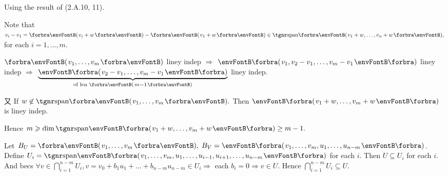 Using the result of (2.A.10, 11).\par\quad
Note that $v_i-v_1=\Par{v_i+w}-\Par{v_1+w}\in\Span{v_1+w,\dots,v_n+w},$ for each $i=1,\dots,m$.\par\quad
$\Par{v_1,\dots,v_m}$ liney indep $\Rightarrow$ $\BigPar{v_1,v_2-v_1,\dots,v_m-v_1}$ liney indep $\Rightarrow$ $\underbrace{\BigPar{v_2-v_1,_{}\dots,v_m-v_1}}_{\text{of len }\Par{m-1}}$ liney indep.\vspace{-15pt}\par\quad
又 If $w\not\in\Span{v_1,\dots,v_m}.$ Then $\BigPar{v_1+w,\dots,v_m+w}$ is liney indep.\par\quad
Hence $m\geqslant\dim\Span[\BigPar]{v_1+w,\dots,v_m+w}\geq m-1.$\PfEnd
\SepLine\pagebreak

Let $B_U=\Par{v_1,\dots,v_m},\;B_V=\BigPar{v_1,\dots,v_m,u_1,\dots,u_{n-m}}$.\parSol{}
Define $U_i=\Span[\BigPar]{v_1,\dots,v_m,u_1,\dots,u_{i-1},u_{i+1},\dots,u_{n-m}}$ for each $i$. Then $U\subseteq U_i$ for each $i.$\vspace{4pt}\parSol{}
And becs $\forall v\in \bigcap\limits_{i=1}^{n-m}U_i,v=v_0+b_1 u_1+\dots+b_{n-m} u_{n-m}\in U_i\Rightarrow$ each $b_i=0\Rightarrow v\in U.$\vspace{-4pt}\parSol{}
Hence $\bigcap\limits_{i=1}^{n-m}U_i\subseteq U.$\PfEnd
\SepLine

